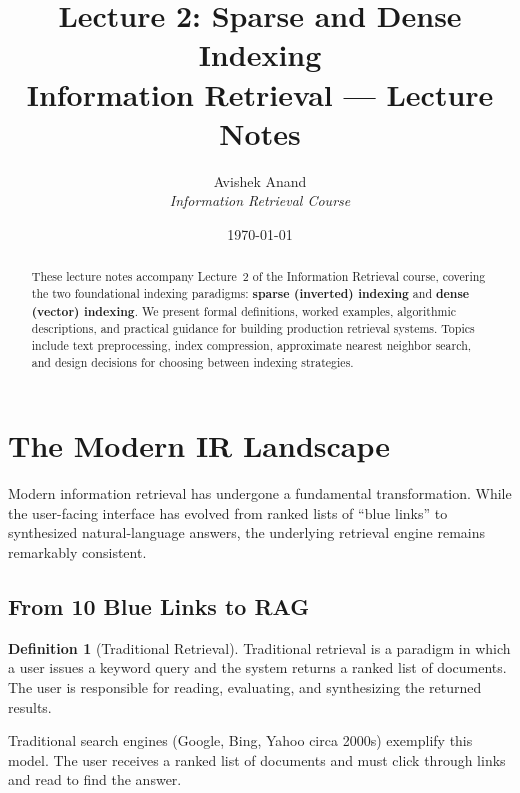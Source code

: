 \documentclass[11pt,a4paper]{article}
\title{\textbf{Lecture 2: Sparse and Dense Indexing}\\[0.5em]\Large Information Retrieval --- Lecture Notes}
\author{Avishek Anand\\\textit{Information Retrieval Course}}
\date{\today}
\theoremstyle{definition}
\newtheorem{definition}{Definition}[section]
\theoremstyle{plain}
\begin{document}
\maketitle

\begin{abstract}
These lecture notes accompany Lecture~2 of the Information Retrieval course, covering the two foundational indexing paradigms: \textbf{sparse (inverted) indexing} and \textbf{dense (vector) indexing}. We present formal definitions, worked examples, algorithmic descriptions, and practical guidance for building production retrieval systems. Topics include text preprocessing, index compression, approximate nearest neighbor search, and design decisions for choosing between indexing strategies.
\end{abstract}

\tableofcontents
\newpage

\section{The Modern IR Landscape}
\label{sec:landscape}

Modern information retrieval has undergone a fundamental transformation. While the user-facing interface has evolved from ranked lists of ``blue links'' to synthesized natural-language answers, the underlying retrieval engine remains remarkably consistent.

\subsection{From 10 Blue Links to RAG}

\begin{center}

\end{center}

\begin{definition}[Traditional Retrieval]
\label{def:traditional-retrieval}
Traditional retrieval is a paradigm in which a user issues a keyword query and the system returns a ranked list of documents. The user is responsible for reading, evaluating, and synthesizing the returned results.
\end{definition}

Traditional search engines (Google, Bing, Yahoo circa 2000s) exemplify this model. The user receives a ranked list of documents and must click through links and read to find the answer.
\end{document}
